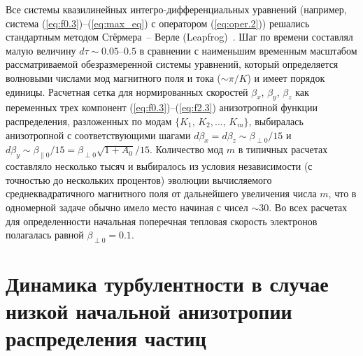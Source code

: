 Все системы квазилинейных интегро-дифференциальных уравнений (например, система (\ref{eq:f0.3})--(\ref{eq:max_eq}) с оператором (\ref{eq:oper.2})) решались стандартным методом Стёрмера~-- Верле (Leapfrog)~\cite{Birdsall2018}. 
Шаг по времени составлял малую величину $d\tau\sim 0.05$--$0.5$ в сравнении с наименьшим временным масштабом рассматриваемой обезразмеренной системы уравнений, который определяется волновыми числами мод магнитного поля и тока ($\sim \! {\pi}/{K}$) и имеет порядок единицы. 
Расчетная сетка для нормированных скоростей $\beta_x$, $\beta_y$, $\beta_z$ как переменных трех компонент (\ref{eq:f0.3})--(\ref{eq:f2.3}) анизотропной функции распределения, разложенных по модам $\{ K_1,\, K_2,...,\,K_{m} \}$, выбиралась анизотропной с соответствующими шагами $d\beta_x=d\beta_z\sim{\beta_{\perp0}}/{15}$ и $d\beta_y\sim{\beta_{\|0}}/{15}={\beta_{\perp0}\sqrt{1+A_0}}/{15}$. 
Количество мод $m$ в типичных расчетах составляло несколько тысяч и выбиралось из условия независимости (с точностью до нескольких процентов) эволюции вычисляемого среднеквадратичного магнитного поля от дальнейшего увеличения числа $m$, что в одномерной задаче обычно имело место начиная с чисел $\sim\! 30$. 
Во всех расчетах для определенности начальная поперечная тепловая скорость электронов полагалась равной $\beta_{\perp0}=0.1$.

\section{Динамика турбулентности в случае низкой начальной анизотропии распределения частиц}\label{sec:ch1/sec3}

